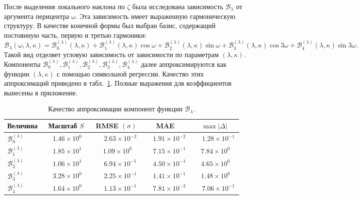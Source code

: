 После выделения локального наклона по \(\zeta\) была исследована зависимость \(\mathcal B_\lambda\) от аргумента перицентра \(\omega\). Эта зависимость имеет выраженную гармоническую структуру. В качестве конечной формы был выбран базис, содержащий постоянную часть, первую и третью гармоники:
\begin{equation}
\mathcal B_\lambda(\omega,\lambda,\kappa)
=
\mathcal B_0^{(\lambda)}(\lambda,\kappa)
+
\mathcal B_1^{(\lambda)}(\lambda,\kappa)\cos\omega
+
\mathcal B_2^{(\lambda)}(\lambda,\kappa)\sin\omega
+
\mathcal B_3^{(\lambda)}(\lambda,\kappa)\cos 3\omega
+
\mathcal B_4^{(\lambda)}(\lambda,\kappa)\sin 3\omega .
\end{equation}
Такой вид отделяет угловую зависимость от зависимости по параметрам \((\lambda,\kappa)\). Компоненты \(\mathcal B_0^{(\lambda)},\mathcal B_1^{(\lambda)},\mathcal B_2^{(\lambda)},\mathcal B_3^{(\lambda)},\mathcal B_4^{(\lambda)}\) далее аппроксимируются как функции \((\lambda,\kappa)\) с помощью символьной регрессии. Качество этих аппроксимаций приведено в табл.~\ref{tab:R_type_II_B_lambda_coef_pysr_quality}. Полные выражения для коэффициентов вынесены в приложение.

\begin{table}[ht]
	\centering
	\caption{Качество аппроксимации компонент функции \(\mathcal B_\lambda\).}
	\label{tab:R_type_II_B_lambda_coef_pysr_quality}
	\begin{tabular}{lcccc}
		\toprule
		Величина & Масштаб \(S\) & RMSE \((\sigma)\) & MAE & \(\max |\Delta|\) \\
		\midrule
		\(\mathcal B_0^{(\lambda)}\) & \(\phantom{-}1.46\times10^{0\phantom{-}}\) & \(\phantom{-}2.63\times10^{-2}\) & \(\phantom{-}1.91\times10^{-2}\) & \(\phantom{-}1.28\times10^{-1}\) \\
		\(\mathcal B_1^{(\lambda)}\) & \(\phantom{-}1.85\times10^{1\phantom{-}}\) & \(\phantom{-}1.09\times10^{0\phantom{-}}\) & \(\phantom{-}7.15\times10^{-1}\) & \(\phantom{-}7.84\times10^{0\phantom{-}}\) \\
		\(\mathcal B_2^{(\lambda)}\) & \(\phantom{-}1.06\times10^{1\phantom{-}}\) & \(\phantom{-}6.94\times10^{-1}\) & \(\phantom{-}4.50\times10^{-1}\) & \(\phantom{-}4.65\times10^{0\phantom{-}}\) \\
		\(\mathcal B_3^{(\lambda)}\) & \(\phantom{-}3.28\times10^{0\phantom{-}}\) & \(\phantom{-}2.25\times10^{-1}\) & \(\phantom{-}1.41\times10^{-1}\) & \(\phantom{-}1.48\times10^{0\phantom{-}}\) \\
		\(\mathcal B_4^{(\lambda)}\) & \(\phantom{-}1.64\times10^{0\phantom{-}}\) & \(\phantom{-}1.13\times10^{-1}\) & \(\phantom{-}7.81\times10^{-2}\) & \(\phantom{-}7.06\times10^{-1}\) \\
		\bottomrule
	\end{tabular}
\end{table}

